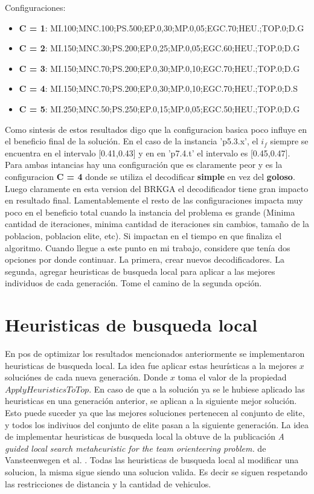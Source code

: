 \bigskip

Configuraciones: 
\begin{itemize}
  \item \textbf{C = 1}: MI.100;MNC.100;PS.500;EP.0,30;MP.0,05;EGC.70;HEU.;TOP.0;D.G
  \item \textbf{C = 2}: MI.150;MNC.30;PS.200;EP.0,25;MP.0,05;EGC.60;HEU.;TOP.0;D.G 
  \item \textbf{C = 3}: MI.150;MNC.70;PS.200;EP.0,30;MP.0,10;EGC.70;HEU.;TOP.0;D.G
  \item \textbf{C = 4}: MI.150;MNC.70;PS.200;EP.0,30;MP.0,10;EGC.70;HEU.;TOP.0;D.S
  \item \textbf{C = 5}: MI.250;MNC.50;PS.250;EP.0,15;MP.0,05;EGC.50;HEU.;TOP.0;D.G 
\end{itemize}

\bigskip

Como sintesis de estos resultados digo que la configuracion basica poco influye en el beneficio final de la solución. En el caso de la instancia 'p5.3.x', el $i_{f}$ siempre se encuentra en el intervalo [0.41,0.43] y en en 'p7.4.t' el intervalo es [0.45,0.47]. Para ambas intancias hay una configuración que es claramente peor y es la configuracion \textbf{C = 4} donde se utiliza el decodificar \textbf{simple} en vez del \textbf{goloso}. Luego claramente en esta version del BRKGA el decodificador tiene gran impacto en resultado final. Lamentablemente el resto de las configuraciones impacta muy poco en el beneficio total cuando la instancia del problema es grande (Minima cantidad de iteraciones, minima cantidad de iteraciones sin cambios, tamaño de la poblacion, poblacion elite, etc). Si impactan en el tiempo en que finaliza el algoritmo. Cuando llegue a este punto en mi trabajo, considere que tenía dos opciones por donde continuar. La primera, crear nuevos decodificadores. La segunda, agregar heuristicas de busqueda local para aplicar a las mejores individuos de cada generación. Tome el camino de la segunda opción.

\bigskip

\section{Heuristicas de busqueda local}

En pos de optimizar los resultados mencionados anteriormente se implementaron heuristicas de busqueda local. La idea fue aplicar estas heurísticas a la mejores $x$ soluciónes de cada nueva generación. Donde $x$ toma el valor de la propiedad $ApplyHeuristicsToTop$. En caso de que a la solución ya se le hubiese aplicado las heuristicas en una generación anterior, se aplican a la siguiente mejor solución. Esto puede suceder ya que las mejores soluciones pertenecen al conjunto de elite, y todos los indiviuos del conjunto de elite pasan a la siguiente generación. La idea de implementar heuristicas de busqueda local la obtuve de la publicación \textit{A guided local search metaheuristic for the team orienteering problem.} de Vansteenwegen et al. \cite{VansteenwegenSouffriauBergheOudheusden}. Todas las heuristicas de busqueda local al modificar una solucion, la misma sigue siendo una solucion valida. Es decir se siguen respetando las restricciones de distancia y la cantidad de vehiculos. 

